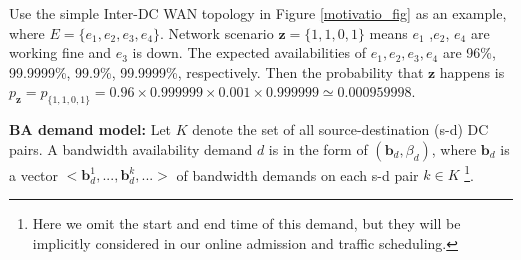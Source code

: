 \documentclass[sigconf]{acmart}
\begin{document}
Use the simple Inter-DC WAN topology in Figure \ref{motivatio_fig} as an example, where $E=\{e_1,e_2,e_3,e_4\}$.
Network scenario $\mathbf{z}=\{1,1,0,1\}$ means $e_1$ ,$e_2$, $e_4$ are working fine and  $e_3$ is down.
The expected availabilities of $e_1,e_2,e_3,e_4$ are 96\%, 99.9999\%, 99.9\%, 99.9999\%, respectively.
Then the probability that $\mathbf{z}$ happens is $p_\mathbf{z}=p_{\{1,1,0,1\}} =0.96\times0.999999\times0.001\times0.999999\simeq 0.000959998$.

\textbf{BA demand model:}
Let $K$ denote the set of all source-destination (s-d) DC pairs.
A bandwidth availability demand $d$ is in the form of $(\mathbf{b}_d, \beta_d)$,
where $\mathbf{b}_d$ is a vector $<\mathbf{b}_d^1, ..., \mathbf{b}_d^k, ...>$ of bandwidth demands on each s-d pair $k \in K$ \footnote{Here we omit the start and end time of this demand, but they will be implicitly considered in our online admission and traffic scheduling.}.
\end{document}
